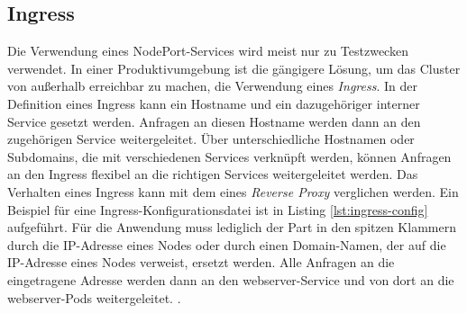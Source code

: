 \documentclass[11pt,a4paper]{article}
\begin{document}
\subsection{Ingress}
\label{sec:Ingress}
Die Verwendung eines NodePort-Services wird meist nur zu Testzwecken verwendet. In einer Produktivumgebung
ist die gängigere Lösung, um das Cluster von außerhalb erreichbar zu machen, die Verwendung eines \emph{Ingress}.
In der Definition eines Ingress kann ein Hostname und ein dazugehöriger interner Service gesetzt werden.
Anfragen an diesen Hostname werden dann an den zugehörigen Service weitergeleitet. Über unterschiedliche Hostnamen
oder Subdomains, die mit verschiedenen Services verknüpft werden, können Anfragen an den Ingress flexibel
an die richtigen Services weitergeleitet werden. Das Verhalten eines Ingress kann mit dem eines \emph{Reverse Proxy} \cite{nginx}
verglichen werden.
Ein Beispiel für eine Ingress-Konfigurationsdatei ist in Listing \ref{lst:ingress-config} aufgeführt.
Für die Anwendung muss lediglich der Part in den spitzen Klammern durch die IP-Adresse eines Nodes
oder durch einen Domain-Namen, der auf die IP-Adresse eines Nodes verweist, ersetzt werden.
Alle Anfragen an die eingetragene Adresse werden dann an den webserver-Service
und von dort an die webserver-Pods weitergeleitet. \cite{Schmeling_Dargatz_2022}.

\end{document}
